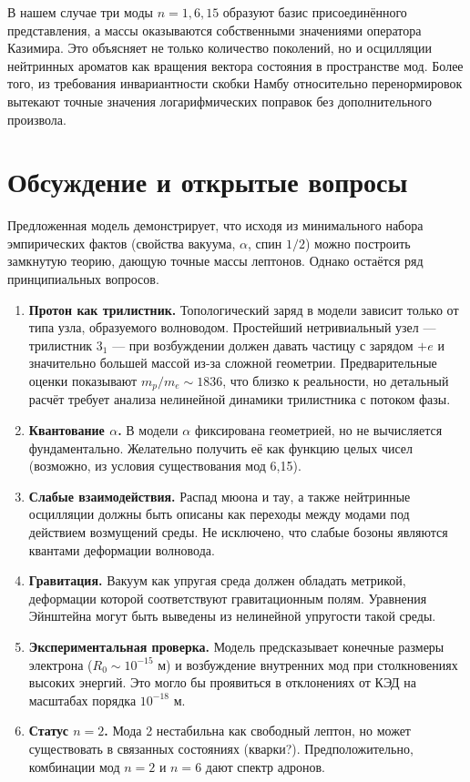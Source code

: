 \documentclass[12pt,a4paper]{article}
\begin{document}
	В нашем случае три моды $n=1,6,15$ образуют базис присоединённого представления, а массы оказываются собственными значениями оператора Казимира. Это объясняет не только количество поколений, но и осцилляции нейтринных ароматов как вращения вектора состояния в пространстве мод. Более того, из требования инвариантности скобки Намбу относительно перенормировок вытекают точные значения логарифмических поправок без дополнительного произвола.
	
	\section{Обсуждение и открытые вопросы}
	Предложенная модель демонстрирует, что исходя из минимального набора эмпирических фактов (свойства вакуума, $\alpha$, спин $1/2$) можно построить замкнутую теорию, дающую точные массы лептонов. Однако остаётся ряд принципиальных вопросов.
	
	\begin{enumerate}
		\item \textbf{Протон как трилистник.} Топологический заряд в модели зависит только от типа узла, образуемого волноводом. Простейший нетривиальный узел — трилистник $3_1$ — при возбуждении должен давать частицу с зарядом $+e$ и значительно большей массой из-за сложной геометрии. Предварительные оценки показывают $m_p/m_e \sim 1836$, что близко к реальности, но детальный расчёт требует анализа нелинейной динамики трилистника с потоком фазы.
		\item \textbf{Квантование $\alpha$.} В модели $\alpha$ фиксирована геометрией, но не вычисляется фундаментально. Желательно получить её как функцию целых чисел (возможно, из условия существования мод 6,15).
		\item \textbf{Слабые взаимодействия.} Распад мюона и тау, а также нейтринные осцилляции должны быть описаны как переходы между модами под действием возмущений среды. Не исключено, что слабые бозоны являются квантами деформации волновода.
		\item \textbf{Гравитация.} Вакуум как упругая среда должен обладать метрикой, деформации которой соответствуют гравитационным полям. Уравнения Эйнштейна могут быть выведены из нелинейной упругости такой среды.
		\item \textbf{Экспериментальная проверка.} Модель предсказывает конечные размеры электрона ($R_0\sim 10^{-15}$ м) и возбуждение внутренних мод при столкновениях высоких энергий. Это могло бы проявиться в отклонениях от КЭД на масштабах порядка $10^{-18}$ м.
		\item \textbf{Статус $n=2$.} Мода 2 нестабильна как свободный лептон, но может существовать в связанных состояниях (кварки?). Предположительно, комбинации мод $n=2$ и $n=6$ дают спектр адронов.
	\end{enumerate}
	
\end{document}
